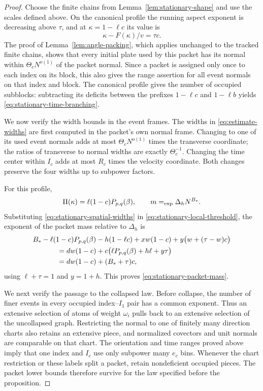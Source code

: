 \begin{proof}
Choose the finite chains from Lemma~\ref{lem:stationary-shape} and
use the scales defined above.
On the canonical profile the running aspect exponent is decreasing
above $\tau$, and at $\kappa=1-\ell c$ its value is
\[
 \kappa-F(\kappa)/v=\tau c.
\]
The proof of Lemma~\ref{lem:angle-packing}, which applies unchanged to
the tracked finite chains, shows that every initial plate used by this
packet has its normal within $\Theta_cN^{o(1)}$ of the packet normal.
Since a packet is assigned only once to each index on its block, this
also gives the range assertion for all event normals on that index and
block. The canonical profile gives the number of occupied subblocks:
subtracting its deficits between the prefixes $1-\ell c$ and
$1-\ell b$ yields \eqref{eq:stationary-time-branching}.

We now verify the width bounds in the event frames.
The widths in \eqref{eq:estimate-widths} are first computed in the
packet's own normal frame. Changing to one of its used event normals
adds at most $\Theta_cN^{o(1)}$ times the transverse coordinate; the
ratios of transverse to normal widths are exactly $\Theta_c^{-1}$.
Changing the time center within $I_c$ adds at most $R_c$ times the
velocity coordinate. Both changes preserve the four widths up to
subpower factors.

For this profile,
\[
 \Pi(\kappa)=\ell(1-c)P_{p,q}(\beta),\qquad
 m\mathrel{=_{\mathrm{exp}}}\Delta_hN^{B_*}.
\]
Substituting \eqref{eq:stationary-spatial-widths} in
\eqref{eq:stationary-local-threshold}, the exponent of the packet mass
relative to $\Delta_h$ is
\begin{align*}
 &B_*-\ell(1-c)P_{p,q}(\beta)-h(1-\ell c)
      +xw(1-c)+y\bigl(w+(\tau-w)c\bigr)\\
 &\hspace{12mm}=dw(1-c)
        +c\bigl(\ell P_{p,q}(\beta)+h\ell+y\tau\bigr)\\
 &\hspace{12mm}=dw(1-c)+(B_*+\tau)c,
\end{align*}
using $\ell+\tau=1$ and $y=1+h$. This proves
\eqref{eq:stationary-packet-mass}.

We next verify the passage to the collapsed law. Before collapse,
the number of finer events in every occupied index--$I_1$ pair has a
common exponent. Thus an extensive selection of atoms of weight
$\omega_i$ pulls back to an extensive selection of the uncollapsed
graph. Restricting the normal to one of finitely many direction charts
also retains an extensive piece, and normalized covectors and unit
normals are comparable on that chart. The orientation and time ranges
proved above imply that one index and $I_c$ use only subpower many
$e_c$ bins. Whenever the chart restriction or these labels split a
packet, retain nondeficient occupied pieces. The packet lower bounds
therefore survive for the law specified before the proposition.


\end{proof}

